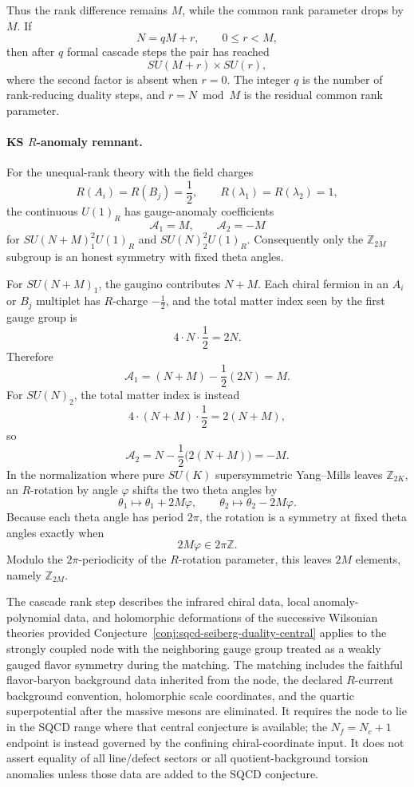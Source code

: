 Thus the rank difference remains \(M\), while the common rank parameter
drops by \(M\).  If
\[
  N=qM+r,\qquad 0\leq r<M ,
\]
then after \(q\) formal cascade steps the pair has reached
\[
  SU(M+r)\times SU(r),
\]
where the second factor is absent when \(r=0\).  The integer \(q\) is the
number of rank-reducing duality steps, and \(r=N\bmod M\) is the residual
common rank parameter.

\paragraph{KS \(R\)-anomaly remnant.}
For the unequal-rank theory with the field charges
\[
  R(A_i)=R(B_j)=\frac12,\qquad R(\lambda_1)=R(\lambda_2)=1,
\]
the continuous \(U(1)_R\) has gauge-anomaly coefficients
\[
  \mathcal A_1=M,\qquad \mathcal A_2=-M
\]
for \(SU(N+M)_1^2U(1)_R\) and \(SU(N)_2^2U(1)_R\).  Consequently only the
\(\mathbb Z_{2M}\) subgroup is an honest symmetry with fixed theta angles.

For \(SU(N+M)_1\), the gaugino contributes \(N+M\).  Each chiral fermion in
an \(A_i\) or \(B_j\) multiplet has \(R\)-charge \(-\frac12\), and the total
matter index seen by the first gauge group is
\[
  4\cdot N\cdot\frac12=2N .
\]
Therefore
\[
  \mathcal A_1=(N+M)-\frac12(2N)=M .
\]
For \(SU(N)_2\), the total matter index is instead
\[
  4\cdot (N+M)\cdot\frac12=2(N+M),
\]
so
\[
  \mathcal A_2=N-\frac12\bigl(2(N+M)\bigr)=-M .
\]
In the normalization where pure \(SU(K)\) supersymmetric Yang--Mills leaves
\(\mathbb Z_{2K}\), an \(R\)-rotation by angle \(\varphi\) shifts the two
theta angles by
\[
  \theta_1\mapsto\theta_1+2M\varphi,\qquad
  \theta_2\mapsto\theta_2-2M\varphi .
\]
Because each theta angle has period \(2\pi\), the rotation is a symmetry at
fixed theta angles exactly when
\[
  2M\varphi\in2\pi\mathbb Z .
\]
Modulo the \(2\pi\)-periodicity of the \(R\)-rotation parameter, this leaves
\(2M\) elements, namely \(\mathbb Z_{2M}\).

\begin{conjecture}
\label{conj:ks-seiberg-duality-cascade}
The cascade rank step describes the infrared chiral data, local
anomaly-polynomial data, and holomorphic deformations of the successive
Wilsonian theories provided Conjecture~\ref{conj:sqcd-seiberg-duality-central}
applies to the strongly coupled node with the neighboring gauge group treated
as a weakly gauged flavor symmetry during the matching.  The matching includes
the faithful flavor-baryon background data inherited from the node, the
declared \(R\)-current background convention, holomorphic scale coordinates,
and the quartic superpotential after the massive mesons are eliminated.  It
requires the node to lie in the SQCD range where that central conjecture is
available; the \(N_f=N_c+1\) endpoint is instead governed by the confining
chiral-coordinate input.  It does not assert equality of all line/defect
sectors or all quotient-background torsion anomalies unless those data are
added to the SQCD conjecture.
\end{conjecture}


